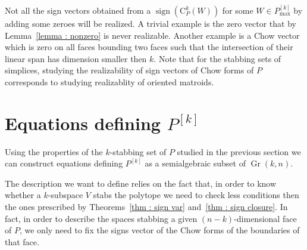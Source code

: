 \documentclass[english]{ourlematema}
\DeclareMathOperator{\Gr}{Gr}
\DeclareMathOperator{\sign}{sign}
\newcommand{\Pk}{P^{[k]}}
\newcommand{\Pkmax}{P^{[k]}_{\max}}
\newcommand{\CPk}{\mathrm{C}_P^k}
\begin{document}
Not all the sign vectors obtained from a $\sign(\CPk(W))$ for some $W\in \Pkmax$ by adding some zeroes will be realized. A trivial example is the zero vector that by Lemma~\ref{lemma : nonzero} is never realizable. Another example is a Chow vector which is zero on all faces bounding two faces such that the intersection of their linear span has dimension smaller then $k$.
Note that for the stabbing sets of simplices, studying the realizability of sign vectors of Chow forms of $P$ corresponds to studying realizablity of oriented matroids. 

\section{Equations defining $\Pk$}

Using the properties of the $k$-stabbing set of $P$ studied in the previous section we can construct equations defining $\Pk$ as a semialgebraic subset of $\Gr(k,n)$. 

The description we want to define relies on the fact that, in order to know whether a $k$-subspace $V$ stabs the polytope we need to check less conditions then the ones prescribed by Theorems~\ref{thm : sign var} and~\ref{thm : sign closure}. In fact, in order to describe the spaces stabbing a given $(n-k)$-dimensional face of $P$, we only need to fix the signs vector of the Chow forms of the boundaries of that face.
\end{document}
